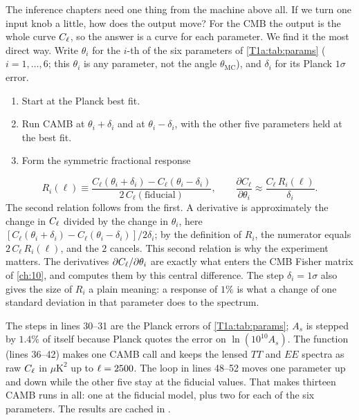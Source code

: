 The inference chapters need one thing from the machine above all. If we turn one input knob a little, how does the output move? For the CMB the output is the whole curve $C_\ell$, so the answer is a curve for each parameter. We find it the most direct way. Write $\theta_i$ for the $i$-th of the six parameters of \cref{T1a:tab:params} ($i=1,\dots,6$; this $\theta_i$ is any parameter, not the angle $\theta_{\mathrm{MC}}$), and $\delta_i$ for its Planck $1\sigma$ error.
\begin{enumerate}[leftmargin=1.6em,itemsep=1pt]
\item Start at the Planck best fit.
\item Run CAMB at $\theta_i+\delta_i$ and at $\theta_i-\delta_i$, with the other five parameters held at the best fit.
\item Form the symmetric fractional response
\end{enumerate}
\begin{equation}
R_i(\ell)\equiv\frac{C_\ell(\theta_i+\delta_i)-C_\ell(\theta_i-\delta_i)}{2\,C_\ell(\text{fiducial})},
\qquad
\frac{\partial C_\ell}{\partial\theta_i}\approx\frac{C_\ell\,R_i(\ell)}{\delta_i}.
\label{T1a:eq:response}
\end{equation}
The second relation follows from the first. A derivative is approximately the change in $C_\ell$ divided by the change in $\theta_i$, here $[C_\ell(\theta_i+\delta_i)-C_\ell(\theta_i-\delta_i)]/2\delta_i$; by the definition of $R_i$, the numerator equals $2\,C_\ell\,R_i(\ell)$, and the $2$ cancels. This second relation is why the experiment matters. The derivatives $\partial C_\ell/\partial\theta_i$ are exactly what enters the CMB Fisher matrix of \cref{ch:10}, and  computes them by this central difference. The step $\delta_i=1\sigma$ also gives the size of $R_i$ a plain meaning: a response of $1\%$ is what a change of one standard deviation in that parameter does to the spectrum.


The steps in lines 30--31 are the Planck errors of \cref{T1a:tab:params}; $A_s$ is stepped by $1.4\%$ of itself because Planck quotes the error on $\ln(10^{10}A_s)$. The function  (lines 36--42) makes one CAMB call and keeps the lensed $TT$ and $EE$ spectra as raw $C_\ell$ in $\mu\mathrm K^2$ up to $\ell=2500$. The loop in lines 48--52 moves one parameter up and down while the other five stay at the fiducial values. That makes thirteen CAMB runs in all: one at the fiducial model, plus two for each of the six parameters. The results are cached in .

